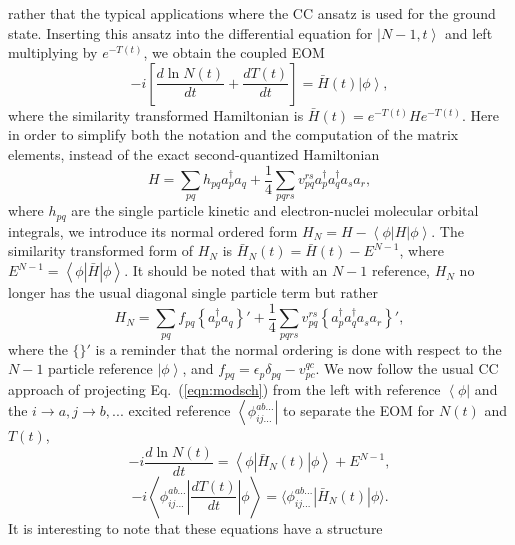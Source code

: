 \documentclass[aps,prb,twocolumn,groupaddress,floatfix]{revtex4}
\begin{document}
rather that the
typical applications where the CC ansatz is used for the ground state.
Inserting this ansatz into
the differential equation for $\left| N-1, t \right>$ and left multiplying 
by $e^{-T(t)}$, we obtain the coupled EOM
\begin{equation}
\label{eqn:modsch}
-i \left[ \frac{d \ln N(t)}{dt} + \frac{d T(t)}{dt} \right] =
\bar{H}(t) \left| \phi \right>,
\end{equation}
where the similarity transformed Hamiltonian is
$\bar{H}(t) = e^{-T(t)}He^{-T(t)}$. Here in order to simplify both the notation
and the computation of the matrix elements, instead of the
exact second-quantized Hamiltonian
\begin{equation}
H = \sum_{pq} h_{pq} a_p^\dagger a_q + 
\frac{1}{4} \sum_{pqrs}
v_{pq}^{rs} a_p^\dagger a_q^\dagger a_s a_r,
\end{equation}
where $h_{pq}$ are the single particle kinetic and electron-nuclei molecular
orbital integrals, we introduce its normal ordered form $H_N
= H - \left< \phi \left| H \right| \phi \right>$. The similarity transformed
form of $H_N$ is $\bar{H}_N(t) = \bar{H}(t) -
E^{N-1}$, where $E^{N-1} = \left< \phi \left| \bar{H} \right|
\phi \right>$. It should be noted that with an $N-1$ reference, 
$H_N$ no longer has the usual diagonal single particle term
but rather
\begin{equation}
H_N = \sum_{pq} f_{pq} \left\{ a_p^\dagger a_q\right\}' + 
\frac{1}{4} \sum_{pqrs}
v_{pq}^{rs} \left\{ a_p^\dagger a_q^\dagger a_s a_r\right\}',
\end{equation}
where the $\{\}'$ is a reminder that the normal ordering is done with respect
to the $N-1$ particle reference $\left| \phi \right>$, and $f_{pq} = \epsilon_p \delta_{pq} - v_{pc}^{qc}$.
We now follow the usual CC approach of
projecting Eq.\ (\ref{eqn:modsch}) from the left with reference $\left< \phi \right|$ and the $i \rightarrow a,j \rightarrow b,...$ excited reference
$\left< \phi_{ij...}^{ab...} \right|$ to separate the EOM for
$N(t)$ and $T(t)$,
\begin{equation}
\label{eq-dlnndt}
-i \frac{d \ln N(t)}{dt} = \left< \phi \left| \bar{H}_N(t) \right| \phi \right>
+ E^{N-1},
\end{equation}
\begin{equation}
\label{eq-dtdt}
-i \left< \phi_{ij...}^{ab...} \left| \frac{d T(t)}{dt} \right| \phi \right> =
\langle \phi_{ij...}^{ab...} \left| \bar{H}_N(t) \right| \phi \rangle.
\end{equation}
It is interesting to note that these equations have a structure
\end{document}
